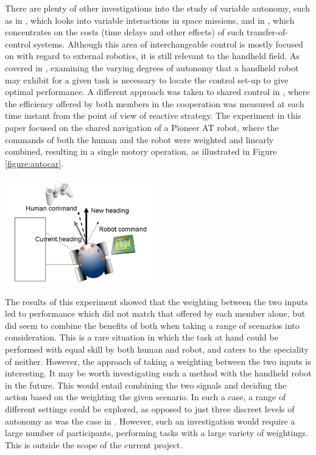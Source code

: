 \documentclass[11pt]{article}
\begin{document}
There are plenty of other investigations into the study of variable autonomy, such as in \cite{Dorais1999}, which looks into variable interactions in space missions, and in \cite{tambe2002}, which concentrates on the costs (time delays and other effects) of such transfer-of-control systems. Although this area of interchangeable control is mostly focused on with regard to external robotics, it is still relevant to the handheld field. As covered in \cite{GreggSmithDesign}, examining the varying degrees of autonomy that a handheld robot may exhibit for a given task is necessary to locate the control set-up to give optimal performance.
A different approach was taken to shared control in \cite{Poncela2009}, where the efficiency offered by both members in the cooperation was measured at each time instant from the point of view of reactive strategy. The experiment in this paper focused on the shared navigation of a Pioneer AT robot, where the commands of both the human and the robot were weighted and linearly combined, resulting in a single motory operation, as illustrated in Figure \ref{figure:autocar}.

\begin{center}
\includegraphics[width=0.48\textwidth]{autocar.png}
\label{figure:autocar}
\end{center}

The results of this experiment showed that the weighting between the two inputs led to performance which did not match that offered by each member alone, but did seem to combine the benefits of both when taking a range of scenarios into consideration. This is a rare situation in which the task at hand could be performed with equal skill by both human and robot, and caters to the speciality of neither. However, the approach of taking a weighting between the two inputs is interesting. It may be worth investigating such a method with the handheld robot in the future. This would entail combining the two signals and deciding the action based on the weighting the given scenario. In such a case, a range of different settings could be explored, as opposed to just three discreet levels of autonomy as was the case in \cite{GreggSmithDesign}. However, such an investigation would require a large number of participants, performing tasks with a large variety of weightings. This is outside the scope of the current project.
\end{document}
